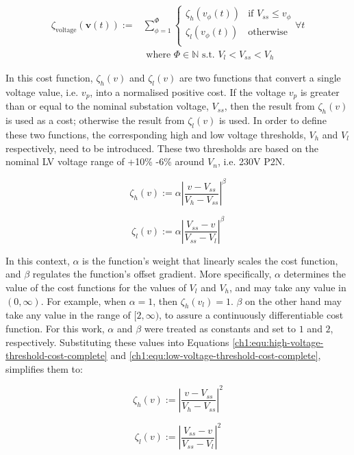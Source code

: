 \begin{equation}
\begin{split}
	\zeta_\text{voltage}(\textbf{v}(t)) :=& \sum_{\phi=1}^{\Phi}{\begin{cases}
		\zeta_h(v_{\phi}(t)) & \text{if } V_{ss} \leq v_\phi\\
		\zeta_l(v_{\phi}(t)) & \text{otherwise}\\
	\end{cases}} \forall t\\
	&\text{ where } \Phi \in \mathbb{N} \text{ s.t. } V_l < V_{ss} < V_h
\end{split}
\label{ch1:equ:voltage-deviation}
\end{equation}

In this cost function, $\zeta_h(v)$ and $\zeta_l(v)$ are two functions that convert a single voltage value, i.e. $v_p$, into a normalised positive cost.
If the voltage $v_p$ is greater than or equal to the nominal substation voltage, $V_{ss}$, then the result from $\zeta_h(v)$ is used as a cost; otherwise the result from $\zeta_l(v)$ is used.
In order to define these two functions, the corresponding high and low voltage thresholds, $V_h$ and $V_l$ respectively, need to be introduced.
These two thresholds are based on the nominal LV voltage range of +10\% -6\% around $V_n$, i.e. 230V P2N.

\begin{equation}
	\zeta_h(v) := \alpha \left|\frac{v-V_{ss}}{V_h-V_{ss}}\right|^{\beta}
	\label{ch1:equ:high-voltage-threshold-cost-complete}
\end{equation}

\begin{equation}
	\zeta_l(v) := \alpha \left|\frac{V_{ss}-v}{V_{ss}-V_l}\right|^{\beta}
	\label{ch1:equ:low-voltage-threshold-cost-complete}
\end{equation}

In this context, $\alpha$ is the function's weight that linearly scales the cost function, and $\beta$ regulates the function's offset gradient.
More specifically, $\alpha$ determines the value of the cost functions for the values of $V_l$ and $V_h$, and may take any value in $(0, \infty)$.
For example, when $\alpha = 1$, then $\zeta_{h}(v_l) = 1$.
$\beta$ on the other hand may take any value in the range of $[2, \infty)$, to assure a continuously differentiable cost function.
For this work, $\alpha$ and $\beta$ were treated as constants and set to $1$ and $2$, respectively.
Substituting these values into Equations \ref{ch1:equ:high-voltage-threshold-cost-complete} and \ref{ch1:equ:low-voltage-threshold-cost-complete}, simplifies them to:

\begin{equation}
	\zeta_h(v) := \left|\frac{v-V_{ss}}{V_h-V_{ss}}\right|^{2}
	\label{ch1:equ:high-voltage-threshold-cost-simple}
\end{equation}

\begin{equation}
	\zeta_l(v) := \left|\frac{V_{ss}-v}{V_{ss}-V_l}\right|^{2}
	\label{ch1:equ:low-voltage-threshold-cost-simple}
\end{equation}
